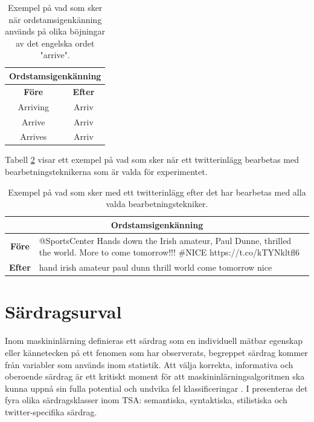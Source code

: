 \documentclass{kaumasters} %
\begin{document}
\begin{table}[H]
\centering
\caption{Exempel på vad som sker när ordstamsigenkänning används på olika böjningar av det engelska ordet "arrive".}
\label{tab:stemming}
    \begin{tabular}{cc}
    \multicolumn{2}{c}{\textbf{Ordstamsigenkänning}} \\
 	\toprule
    \textbf{Före} & \textbf{Efter} \\
    \midrule
    Arriving & Arriv \\
    Arrive & Arriv \\
    Arrives & Arriv \\
    \bottomrule
\end{tabular}
\end{table}

Tabell \ref{tab:preproc} visar ett exempel på vad som sker när ett twitterinlägg bearbetas med bearbetningsteknikerna som är valda för experimentet. 

\begin{table}[H]
\centering
\caption{Exempel på vad som sker med ett twitterinlägg efter det har bearbetas med alla valda bearbetningstekniker.}
\label{tab:preproc}
    \begin{tabularx}{\textwidth}{cX}
    \multicolumn{2}{c}{\textbf{Ordstamsigenkänning}} \\
    \midrule
    \textbf{Före}&  {@SportsCenter Hands down the Irish amateur, Paul Dunne, thrilled the world. More to come tomorrow!!! \#NICE https://t.co/kTYNkltfl6} \\
\textbf{Efter}& hand irish amateur paul dunn thrill world come tomorrow nice \\
    \bottomrule
\end{tabularx}
\end{table}





\section{Särdragsurval} \label{exp:feat}
Inom maskininlärning definieras ett särdrag som en individuell mätbar egenskap eller kännetecken på ett fenomen som har observerats, begreppet särdrag kommer från variabler som används inom statistik. Att välja korrekta, informativa och oberoende särdrag är ett kritiskt moment för att maskininlärningsalgoritmen ska kunna uppnå sin fulla potential och undvika fel klassificeringar \cite{wiki:014}. 
I \cite{TSAsurvey} presenteras det fyra olika särdragsklasser inom TSA: semantiska, syntaktiska, stilistiska och twitter-specifika särdrag.
\end{document}
